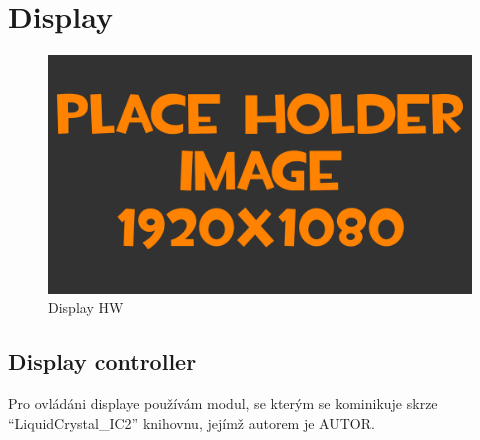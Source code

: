 
\section{Display}
\begin{figure}[h!]
	\centering
	\includegraphics[width=\textwidth]{pictures/placeHolderFHD.png}
    	\caption{Display HW}
   	\label{fig:displayHW}
\end{figure}

\newpage
\subsection{Display controller}

Pro ovládáni displaye používám modul, se kterým se kominikuje skrze “LiquidCrystal\_IC2” knihovnu, jejímž autorem je AUTOR.